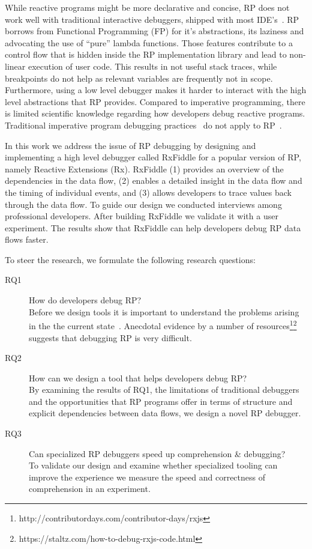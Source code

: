 While reactive programs might be more declarative and concise, RP does not work well with traditional interactive debuggers, shipped with most IDE's~\cite{salvaneschi2016debugging}. RP borrows from Functional Programming (FP) for it's abstractions, its laziness and advocating the use of ``pure'' lambda functions. Those features contribute to a control flow that is hidden inside the RP implementation library and lead to non-linear execution of user code. This results in not useful stack traces, while breakpoints do not help as relevant variables are frequently not in scope. Furthermore, using a low level debugger makes it harder to interact with the high level abstractions that RP provides.
Compared to imperative programming, there is limited scientific knowledge regarding how developers debug reactive programs. Traditional imperative program debugging practices~\cite{beller2017behavior} do not apply to RP~\cite{salvaneschi2016debugging}.

In this work we address the issue of RP debugging by designing and implementing a high level debugger called RxFiddle for a popular version of RP, namely Reactive Extensions (Rx). RxFiddle  (1) provides an overview of the dependencies in the data flow, (2) enables a detailed insight in the data flow and the timing of individual events, and (3) allows developers to trace values back through the data flow. To guide our design we conducted interviews among professional developers. After building RxFiddle we validate it with a user experiment. The results show that RxFiddle can help developers debug RP data flows faster.

To steer the research, we formulate the following research questions:

\begin{description}
\item[RQ1] How do developers debug RP? \\
Before we design tools it is important to understand the problems arising in the the current state~\cite{singer2010examination}. Anecdotal evidence by a number of resources\footnote{\label{foot:contribdays}http://contributordays.com/contributor-days/rxjs}\footnote{https://staltz.com/how-to-debug-rxjs-code.html}
suggests that debugging RP is very difficult.

\item[RQ2] How can we design a tool that helps developers debug RP? \\
By examining the results of RQ1, the limitations of traditional debuggers and the opportunities that RP programs offer in terms of structure and explicit dependencies between data flows, we design a novel RP debugger.

\item[RQ3] Can specialized RP debuggers speed up comprehension \& debugging? \\
To validate our design and examine whether specialized tooling can improve the experience we measure the speed and correctness of comprehension in an experiment.

\end{description}

